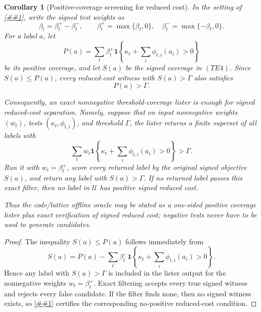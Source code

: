 \documentclass[10pt]{article}
\newcommand{\cref}[1]{\ref{##1}}
\newtheorem{corollary}[theorem]{Corollary}
\theoremstyle{definition}
\begin{document}
\begin{corollary}[Positive-coverage screening for reduced cost]
   \label{cor:positive-coverage-screen}
   In the setting of \cref{cor:threshold-event-reduced-cost}, write the signed
   test weights as
   \[
      \beta_t=\beta_t^+-\beta_t^-,
      \qquad
      \beta_t^+=\max\{\beta_t,0\},\quad
      \beta_t^-=\max\{-\beta_t,0\}.
      \tag{PS1}
   \]
   For a label \(a\), let
   \[
      P(a)=
      \sum_t\beta_t^+
      \mathbf 1\left\{
      \kappa_t+\sum_i\phi_{t,i}(a_i)>0
      \right\}
      \tag{PS2}
   \]
   be its positive coverage, and let \(S(a)\) be the signed coverage in
   \((TE4)\).  Since \(S(a)\le P(a)\), every reduced-cost witness with
   \(S(a)>\Gamma\) also satisfies
   \[
      P(a)>\Gamma .
      \tag{PS3}
   \]

   Consequently, an exact nonnegative threshold-coverage lister is enough for
   signed reduced-cost separation.  Namely, suppose that on input nonnegative
   weights \((w_t)\), tests \((\kappa_t,\phi_{t,i})\), and threshold
   \(\Gamma\), the lister returns a finite superset of all labels with
   \[
      \sum_t w_t
      \mathbf 1\left\{
      \kappa_t+\sum_i\phi_{t,i}(a_i)>0
      \right\}>\Gamma .
      \tag{PS4}
   \]
   Run it with \(w_t=\beta_t^+\), score every returned label by the original
   signed objective \(S(a)\), and return any label with \(S(a)>\Gamma\).  If no
   returned label passes this exact filter, then no label in \(\mathcal U\)
   has positive signed reduced cost.

   Thus the code/lattice offline oracle may be stated as a one-sided positive
   coverage lister plus exact verification of signed reduced cost; negative
   tests never have to be used to generate candidates.
\end{corollary}

\begin{proof}
   The inequality \(S(a)\le P(a)\) follows immediately from
   \[
      S(a)=P(a)-
      \sum_t\beta_t^-
      \mathbf 1\left\{
      \kappa_t+\sum_i\phi_{t,i}(a_i)>0
      \right\}.
   \]
   Hence any label with \(S(a)>\Gamma\) is included in the lister output for
   the nonnegative weights \(w_t=\beta_t^+\).  Exact filtering accepts every
   true signed witness and rejects every false candidate.  If the filter finds
   none, then no signed witness exists, so
   \cref{cor:threshold-event-reduced-cost} certifies the corresponding
   no-positive reduced-cost condition.
\end{proof}
\end{document}
